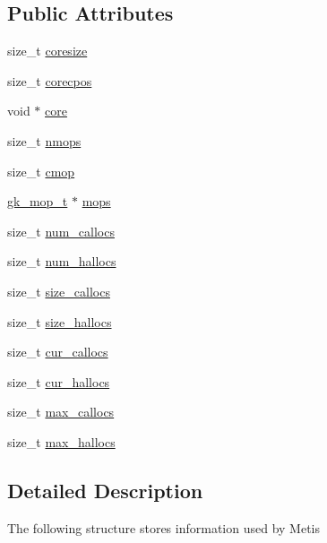 \subsection*{Public Attributes}
\begin{DoxyCompactItemize}
\item 
size\+\_\+t \hyperlink{structgk__mcore__t_a834677bb8263a1b0475104889883c86c}{coresize}
\item 
size\+\_\+t \hyperlink{structgk__mcore__t_a5cc856b4f3049f9d49c9f3ec10b73739}{corecpos}
\item 
void $\ast$ \hyperlink{structgk__mcore__t_a2d0056e8cc124fad35b901e89668b8b1}{core}
\item 
size\+\_\+t \hyperlink{structgk__mcore__t_a30d17f8009db5d7cf61094259ff9e26f}{nmops}
\item 
size\+\_\+t \hyperlink{structgk__mcore__t_a3631e211c793af96e0abf21cb95de4ae}{cmop}
\item 
\hyperlink{structgk__mop__t}{gk\+\_\+mop\+\_\+t} $\ast$ \hyperlink{structgk__mcore__t_a74e825c8a07e7c040dbf947bedac3339}{mops}
\item 
size\+\_\+t \hyperlink{structgk__mcore__t_afd16bb0581bc9e98172b2ab35cbc310c}{num\+\_\+callocs}
\item 
size\+\_\+t \hyperlink{structgk__mcore__t_a2ad475b19470a6a7b0c65e53cfd1096b}{num\+\_\+hallocs}
\item 
size\+\_\+t \hyperlink{structgk__mcore__t_aa407f9b9ca318fa8afa36ab1c936ec07}{size\+\_\+callocs}
\item 
size\+\_\+t \hyperlink{structgk__mcore__t_a4c180c60538546b4ab67bb91264e1c6e}{size\+\_\+hallocs}
\item 
size\+\_\+t \hyperlink{structgk__mcore__t_a488b0e7fbec1333c47a736af554a640c}{cur\+\_\+callocs}
\item 
size\+\_\+t \hyperlink{structgk__mcore__t_a69514abe8ce1822030428ca391a903e7}{cur\+\_\+hallocs}
\item 
size\+\_\+t \hyperlink{structgk__mcore__t_a536a8ab027c1f70bfe5b56a26059589b}{max\+\_\+callocs}
\item 
size\+\_\+t \hyperlink{structgk__mcore__t_a74723a880e8829c81bd3a38ed474f09a}{max\+\_\+hallocs}
\end{DoxyCompactItemize}


\subsection{Detailed Description}
The following structure stores information used by Metis 

